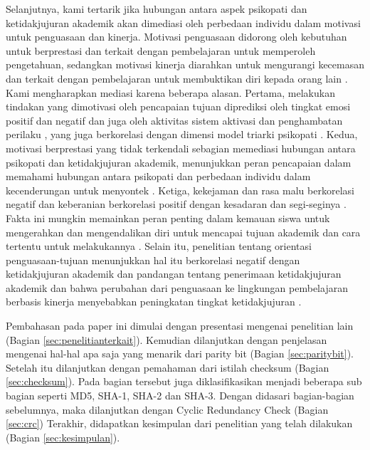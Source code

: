 Selanjutnya, kami tertarik jika hubungan antara aspek psikopati dan ketidakjujuran akademik akan dimediasi oleh perbedaan individu dalam motivasi untuk penguasaan dan kinerja. Motivasi penguasaan didorong oleh kebutuhan untuk berprestasi dan terkait dengan pembelajaran untuk memperoleh pengetahuan, sedangkan motivasi kinerja diarahkan untuk mengurangi kecemasan dan terkait dengan pembelajaran untuk membuktikan diri kepada orang lain \citep{elliot2008measurement}. Kami mengharapkan mediasi karena beberapa alasan. Pertama, melakukan tindakan yang dimotivasi oleh pencapaian tujuan diprediksi oleh tingkat emosi positif dan negatif dan juga oleh aktivitas sistem aktivasi dan penghambatan perilaku \citep{elliot2002approach}, yang juga berkorelasi dengan dimensi model triarki psikopati \citep{sellbom2013examination}. Kedua, motivasi berprestasi yang tidak terkendali sebagian memediasi hubungan antara psikopati dan ketidakjujuran akademik, menunjukkan peran pencapaian dalam memahami hubungan antara psikopati dan perbedaan individu dalam kecenderungan untuk menyontek \citep{williams2010identifying}. Ketiga, kekejaman dan rasa malu berkorelasi negatif dan keberanian berkorelasi positif dengan kesadaran dan segi-seginya \citep{poy2014ffm} \citep{pilch2015polska}. Fakta ini mungkin memainkan peran penting dalam kemauan siswa untuk mengerahkan dan mengendalikan diri untuk mencapai tujuan akademik dan cara tertentu untuk melakukannya \citep{mccabe2013big}. Selain itu, penelitian tentang orientasi penguasaan-tujuan menunjukkan hal itu berkorelasi negatif dengan ketidakjujuran akademik dan pandangan tentang penerimaan ketidakjujuran akademik \citep{bong2014perfectionism} \citep{van2011win} \citep{yang2013investigation} dan bahwa perubahan dari penguasaan ke lingkungan pembelajaran berbasis kinerja menyebabkan peningkatan tingkat ketidakjujuran \citep{anderman2004changes}.

Pembahasan pada paper ini dimulai dengan presentasi mengenai penelitian lain (Bagian \ref{sec:penelitianterkait}).
Kemudian dilanjutkan dengan penjelasan mengenai hal-hal apa saja yang menarik dari parity bit (Bagian \ref{sec:paritybit}).
Setelah itu dilanjutkan dengan pemahaman dari istilah checksum (Bagian \ref{sec:checksum}). Pada bagian tersebut juga diklasifikasikan menjadi beberapa sub bagian seperti MD5, SHA-1, SHA-2 dan SHA-3.
Dengan didasari bagian-bagian sebelumnya, maka dilanjutkan dengan Cyclic Redundancy Check  (Bagian \ref{sec:crc})
Terakhir, didapatkan kesimpulan dari penelitian yang telah dilakukan (Bagian \ref{sec:kesimpulan}).
